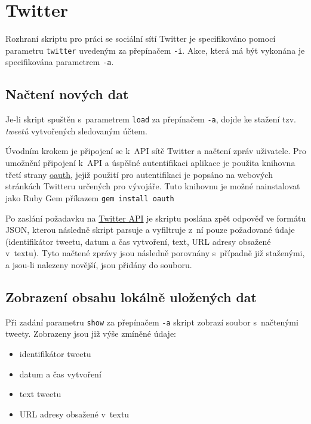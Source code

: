 \documentclass[11pt,a4paper]{article}
\begin{document}
  \section{Twitter}

    Rozhraní skriptu pro práci se sociální sítí Twitter je specifikováno pomocí
    parametru \texttt{twitter} uvedeným za přepínačem \texttt{-i}.
    Akce, která má být vykonána je specifikována parametrem \texttt{-a}.

    \subsection{Načtení nových dat} \label{twitter-nacteni}

      Je-li skript spuštěn s~parametrem \texttt{load} za přepínačem
      \texttt{-a}, dojde ke stažení tzv. \textit{tweetů} vytvořených sledovaným
      účtem.

      Úvodním krokem je připojení se k~API sítě Twitter a načtení zpráv
      uživatele. Pro umožnění připojení k~API a úspěšné autentifikaci aplikace
      je použita knihovna třetí strany
      \href{https://github.com/oauth-xx/oauth-ruby}{oauth}, jejiž použití
      pro autentifikaci je popsáno na webových stránkách Twitteru určených pro
      vývojáře.
      Tuto knihovnu je možné nainstalovat jako Ruby Gem příkazem
      \texttt{gem install oauth}

      Po zaslání požadavku na
      \href{https://dev.twitter.com/rest/reference/get/statuses/user_timeline}
      {Twitter API} je skriptu poslána zpět odpověď ve formátu JSON, kterou
      následně skript parsuje a vyfiltruje z~ní pouze požadované údaje
      (identifikátor tweetu, datum a čas vytvoření, text, URL adresy obsažené
      v~textu). Tyto načtené zprávy jsou následně porovnány s~případně již
      staženými, a jsou-li nalezeny novější, jsou přidány do souboru.

    \subsection{Zobrazení obsahu lokálně uložených dat}

      Při zadání parametru \texttt{show} za přepínačem \texttt{-a} skript
      zobrazí soubor s~načtenými tweety. Zobrazeny jsou již výše zmíněné údaje:

      \begin{itemize}
        \item identifikátor tweetu
        \item datum a čas vytvoření
        \item text tweetu
        \item URL adresy obsažené v~textu
      \end{itemize}
\end{document}
